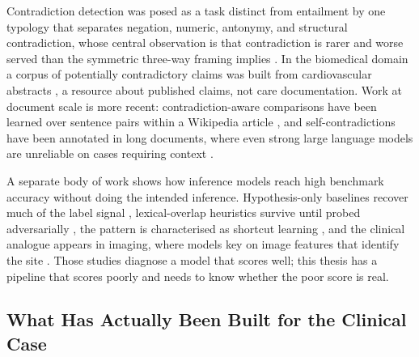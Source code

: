 Contradiction detection was posed as a task distinct from entailment by one typology that
separates negation, numeric, antonymy, and structural contradiction, whose central observation is
that contradiction is rarer and worse served than the symmetric three-way framing implies
\citep{demarneffe2008contradictions}. In the biomedical domain a corpus of potentially contradictory
claims was built from cardiovascular abstracts \citep{alamri2016corpus}, a resource about published
claims, not care documentation. Work at document scale
is more recent: contradiction-aware comparisons have been learned over sentence
pairs within a Wikipedia article \citep{hsu2021wikicontradiction}, and self-contradictions have been
annotated in long documents, where even strong large language models are unreliable on cases
requiring context \citep{li2024contradoc}.

A separate body of work shows how inference models reach high benchmark accuracy without doing the
intended inference. Hypothesis-only baselines recover much of the label signal
\citep{poliak2018hypothesis,gururangan2018artifacts}, lexical-overlap heuristics survive until probed
adversarially \citep{mccoy2019hans}, the pattern is characterised as shortcut learning
\citep{geirhos2020shortcut}, and the clinical analogue appears in imaging, where models key on image features that identify the site \citep{zech2018generalization}. Those studies diagnose a model that scores
well; this thesis has a pipeline that scores poorly and needs to know whether the poor score is real.

\subsection{What Has Actually Been Built for the Clinical Case}

